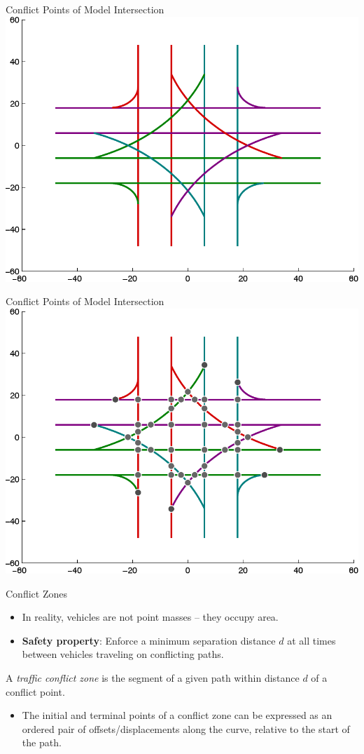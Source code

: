 \begin{frame}{Conflict Points of Model Intersection}
\centering\includegraphics[width=0.8\linewidth]{diagram/intxn_plain.pdf}
\end{frame}


\begin{frame}{Conflict Points of Model Intersection}
\centering\includegraphics[width=0.8\linewidth]{diagram/intxn_pts.pdf}
\end{frame}


\begin{frame}{Conflict Zones}
\begin{itemize}
\item In reality, vehicles are not point masses -- they occupy area.
\item \textbf{Safety property}:
	Enforce a minimum separation distance $d$ at all times
	between vehicles traveling on conflicting paths.
\end{itemize}

\begin{definition}
A \emph{traffic conflict zone} is the segment of a given path within
	distance $d$ of a conflict point.
\end{definition}

\begin{itemize}
\item The initial and terminal points of a conflict zone can be expressed
	as an ordered pair of offsets/displacements along the curve, relative
	to the start of the path.
\end{itemize}
\end{frame}

